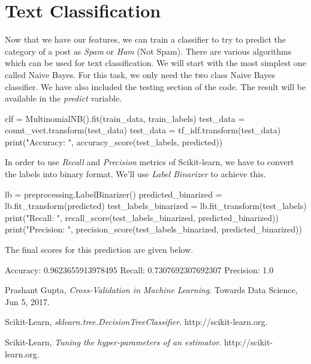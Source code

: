 \documentclass[12pt]{article}
\numberwithin{equation}{section}
\numberwithin{table}{section}
\numberwithin{figure}{section}
\begin{document}
\section{Text Classification}
Now that we have our features, we can train a classifier to try to predict the category of a post as \textit{Spam} or \textit{Ham} (Not Spam). There are various algorithms which can be used for text classification. We will start with the most simplest one called Naive Bayes. For this task, we only need the two class Naive Bayes classifier. We have also included the testing section of the code. The result will be available in the \textit{predict} variable.
\begin{python}
	clf = MultinomialNB().fit(train_data, train_labels)
	test_data = count_vect.transform(test_data)
	test_data = tf_idf.transform(test_data)
	print("Accuracy: ", accuracy_score(test_labels, predicted))
\end{python}
In order to use \textit{Recall} and \textit{Precision} metrics of Scikit-learn, we have to convert the labels into binary format. We'll use \textit{Label Binarizer} to achieve this.
\begin{python}
	lb = preprocessing.LabelBinarizer()
	predicted_binarized = lb.fit_transform(predicted)
	test_labels_binarized = lb.fit_transform(test_labels)
	print("Recall: ", recall_score(test_labels_binarized, predicted_binarized))
	print("Precision: ", precision_score(test_labels_binarized, predicted_binarized))
\end{python}
The final scores for this prediction are given below.
\begin{python}
	Accuracy:  0.9623655913978495
	Recall:  0.7307692307692307
	Precision:  1.0
\end{python}

\begin{thebibliography}{999}
	
	Prashant Gupta,
	\emph{Cross-Validation in Machine Learning}.
	Towards Data Science,
	Jun 5, 2017.
	
	Scikit-Learn,
	\emph{sklearn.tree.DecisionTreeClassifier}.
	http://scikit-learn.org.
	
	Scikit-Learn,
	\emph{Tuning the hyper-parameters of an estimator}.
	http://scikit-learn.org.
	
\end{thebibliography}
\end{document}
